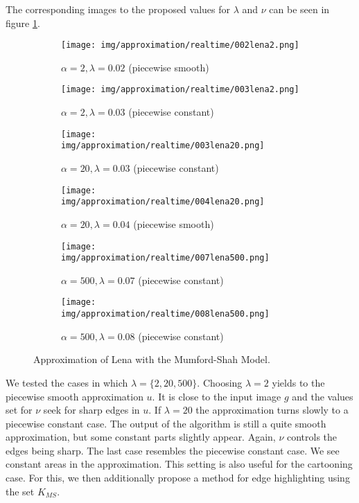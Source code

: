         The corresponding images to the proposed values for $\lambda$ and $\nu$ can be seen in figure \ref{fig:realtime_lena_compare}.

        \begin{figure}[ht]
            \centering
            \begin{subfigure}[b]{0.32\textwidth}
                \texttt{[image: img/approximation/realtime/002lena2.png]}
                \caption{$\alpha = 2, \lambda = 0.02$ (piecewise smooth)}
            \end{subfigure}
            \begin{subfigure}[b]{0.32\textwidth}
                \texttt{[image: img/approximation/realtime/003lena2.png]}
                \caption{$\alpha = 2, \lambda = 0.03$ (piecewise constant)}
            \end{subfigure}
            \begin{subfigure}[b]{0.32\textwidth}
                \texttt{[image: img/approximation/realtime/003lena20.png]}
                \caption{$\alpha = 20, \lambda = 0.03$ (piecewise constant)}
            \end{subfigure}
            \begin{subfigure}[b]{0.32\textwidth}
                \texttt{[image: img/approximation/realtime/004lena20.png]}
                \caption{$\alpha = 20, \lambda = 0.04$ (piecewise smooth)}
            \end{subfigure}
            \begin{subfigure}[b]{0.32\textwidth}
                \texttt{[image: img/approximation/realtime/007lena500.png]}
                \caption{$\alpha = 500, \lambda = 0.07$ (piecewise constant)}
            \end{subfigure}
            \begin{subfigure}[b]{0.32\textwidth}
                \texttt{[image: img/approximation/realtime/008lena500.png]}
                \caption{$\alpha = 500, \lambda = 0.08$ (piecewise constant)}
            \end{subfigure}
            \caption{Approximation of Lena with the Mumford-Shah Model.}
        \label{fig:realtime_lena_compare}
        \end{figure}

        We tested the cases in which $\lambda = \{2, 20, 500\}$. Choosing $\lambda = 2$ yields to the piecewise smooth approximation $u$. It is close to the input image $g$ and the values set for $\nu$ seek for sharp edges in $u$. If $\lambda = 20$ the approximation turns slowly to a piecewise constant case. The output of the algorithm is still a quite smooth approximation, but some constant parts slightly appear. Again, $\nu$ controls the edges being sharp. The last case resembles the piecewise constant case. We see constant areas in the approximation. This setting is also useful for the cartooning case. For this, we then additionally propose a method for edge highlighting using the set $K_{MS}$.

